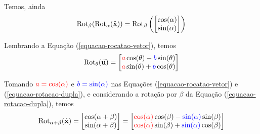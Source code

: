 \documentclass[12pt, a4paper]{article}
\begin{document}
    Temos, ainda
    \begin{equation}
        \label{equacao-rotacao-dupla}
        \text{Rot}_\beta(\text{Rot}_\alpha(\hat{\textbf{x}}))
        =
        \text{Rot}_\beta\left(
            \begin{bmatrix}
                \cos(\alpha)\\
                \sin(\alpha)
            \end{bmatrix}
        \right)
    \end{equation}
    
    Lembrando a Equação (\ref{equacao-rocatao-vetor}), temos
    \[
        \text{Rot}_\theta(\Vec{\textbf{u}})
        =
        \begin{bmatrix}
            \color{red}a\color{black}\cos(\theta)-\color{blue}b\color{black}\sin(\theta)\\
            \color{red}a\color{black}\sin(\theta)+\color{blue}b\color{black}\cos(\theta)
        \end{bmatrix}
    \]

    Tomando $\color{red}a=\cos(\alpha)$ e $\color{blue}b=\sin(\alpha)$ nas Equações (\ref{equacao-rocatao-vetor}) e (\ref{equacao-rotacao-dupla}), e considerando a rotação por $\beta$ da Equação (\ref{equacao-rotacao-dupla}), temos
    \[
        \text{Rot}_{\alpha+\beta}(\hat{\textbf{x}})
        =
        \begin{bmatrix}
            \cos(\alpha+\beta)\\
            \sin(\alpha+\beta)
        \end{bmatrix}
        =
        \begin{bmatrix}
            \color{red}\cos(\alpha)\color{black}\cos(\beta)-\color{blue}\sin(\alpha)\color{black}\sin(\beta)\\
            \color{red}\cos(\alpha)\color{black}\sin(\beta)+\color{blue}\sin(\alpha)\color{black}\cos(\beta)
        \end{bmatrix}
    \]
    
\end{document}
